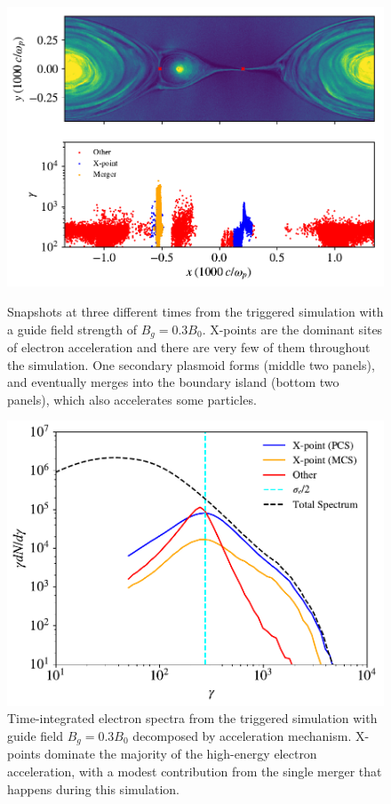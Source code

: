 \documentclass[iop,twocolappendix]{emulateapj}
\begin{document}
\begin{figure}[htp]
{	}
	\newline
	{
		\includegraphics[width=\linewidth]{bguide3_triggered_snap46.pdf}
	}
	
	\caption{Snapshots at three different times from the triggered simulation with a guide field strength of $B_{g}=0.3B_{0}$.  X-points are the dominant sites of electron acceleration and there are very few of them throughout the simulation.  One secondary plasmoid forms (middle two panels), and eventually merges into the boundary island (bottom two panels), which also accelerates some particles.
	}
	\label{triggered_bguide_snapshots}
\end{figure}


\begin{figure}[htp]
	
	\includegraphics[width=\linewidth]{bguide3_triggered_withspec.pdf}
	\caption{Time-integrated electron spectra from the triggered simulation with guide field $B_{g}=0.3B_{0}$ decomposed by acceleration mechanism.  X-points dominate the majority of the high-energy electron acceleration, with a modest contribution from the single merger that happens during this simulation.}
	\label{triggered_bguide_spec}
\end{figure}
\end{document}
